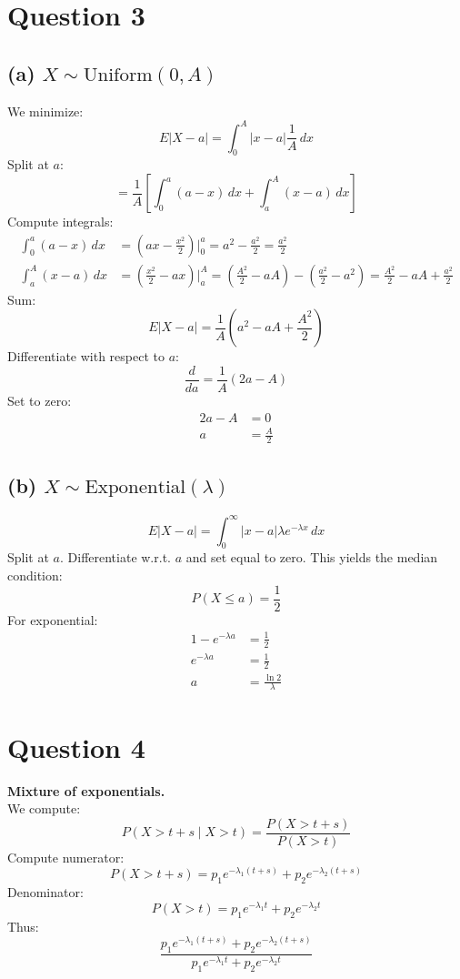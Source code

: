 \documentclass[11pt]{article}
\begin{document}
\section*{Question 3}
\subsection*{(a) $X \sim \text{Uniform}(0,A)$}
We minimize:
\[
E|X-a| = \int_0^A |x-a| \frac{1}{A} \, dx
\]
Split at $a$:
\[
= \frac{1}{A} \left[ \int_0^a (a-x) \, dx + \int_a^A (x-a) \, dx \right]
\]
Compute integrals:
\begin{align*}
\int_0^a (a-x) \, dx &= \left( ax - \frac{x^2}{2} \right)\Bigg|_0^a = a^2 - \frac{a^2}{2} = \frac{a^2}{2} \\
\int_a^A (x-a) \, dx &= \left( \frac{x^2}{2} - ax \right)\Bigg|_a^A = \left(\frac{A^2}{2} - aA\right) - \left(\frac{a^2}{2}-a^2\right) = \frac{A^2}{2} - aA + \frac{a^2}{2}
\end{align*}
Sum:
\[
E|X-a| = \frac{1}{A} \left( a^2 - aA + \frac{A^2}{2} \right)
\]
Differentiate with respect to $a$:
\[
\frac{d}{da} = \frac{1}{A}(2a - A)
\]
Set to zero:
\begin{align*}
2a - A &= 0 \\
a &= \frac{A}{2}
\end{align*}

\subsection*{(b) $X \sim \text{Exponential}(\lambda)$}
\[
E|X-a| = \int_0^\infty |x-a| \lambda e^{-\lambda x} \, dx
\]
Split at $a$. Differentiate w.r.t. $a$ and set equal to zero.
This yields the median condition:
\[
P(X \le a) = \frac{1}{2}
\]
For exponential:
\begin{align*}
1 - e^{-\lambda a} &= \frac{1}{2} \\
e^{-\lambda a} &= \frac{1}{2} \\
a &= \frac{\ln 2}{\lambda}
\end{align*}

\section*{Question 4}
\textbf{Mixture of exponentials.} \\
We compute:
\[
P(X > t+s \mid X > t) = \frac{P(X>t+s)}{P(X>t)}
\]
Compute numerator:
\[
P(X>t+s) = p_1 e^{-\lambda_1(t+s)} + p_2 e^{-\lambda_2(t+s)}
\]
Denominator:
\[
P(X>t) = p_1 e^{-\lambda_1 t} + p_2 e^{-\lambda_2 t}
\]
Thus:
\[
\frac{p_1 e^{-\lambda_1(t+s)} + p_2 e^{-\lambda_2(t+s)}}{p_1 e^{-\lambda_1 t} + p_2 e^{-\lambda_2 t}}
\]
\end{document}
